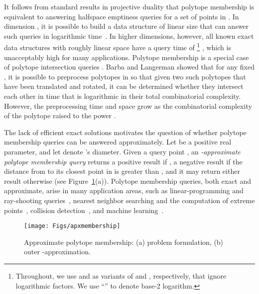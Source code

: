 \documentclass[11pt]{article}   \usepackage[letterpaper,hmargin=2.1cm,vmargin=3cm]{geometry}
\begin{document}
It follows from standard results in projective duality that polytope membership is equivalent to answering halfspace emptiness queries for a set of  points in . In dimension , it is possible to build a data structure of linear size that can answer such queries in logarithmic time~\cite{textbook}. In higher dimensions, however, all known exact data structures with roughly linear space have a query time
of \footnote{Throughout, we use  and  as variants of  and , respectively, that ignore logarithmic factors. We use ``'' to denote base-2 logarithm.}
\cite{Mat92}, which is unacceptably high for many applications. Polytope membership is a special case of polytope intersection queries \cite{ChD87,DoK83,BaL15}. Barba and Langerman \cite{BaL15} showed that for any fixed , it is possible to preprocess polytopes in  so that given two such polytopes that have been translated and rotated, it can be determined whether they intersect each other in time that is logarithmic in their total combinatorial complexity. However, the preprocessing time and space grow as the combinatorial complexity of the polytope raised to the power .

The lack of efficient exact solutions motivates the question of whether polytope membership queries can be answered approximately. Let  be a positive real parameter, and let  denote 's diameter. Given a query point , an \emph{-approximate polytope membership query} returns a positive result if , a negative result if the distance from  to its closest point in  is greater than , and it may return either result otherwise (see Figure~\ref{fig:apxmembership}(a)). Polytope membership queries, both exact and approximate, arise in many application areas, such as linear-programming and ray-shooting queries~\cite{lp-Chan, lp-Chan2, lp-Ramos, lp-Mat, lp-Mat2}, nearest neighbor searching and the computation of extreme points~\cite{hull-Chan,Clarkson-ANN}, collision detection~\cite{collision2}, and machine learning~\cite{SVM}. 

\begin{figure}[htbp]
  \centerline{\texttt{[image: Figs/apxmembership]}}
  \caption{Approximate polytope membership: (a) problem formulation, (b) outer -approximation.}
  \label{fig:apxmembership}
\end{figure}
\end{document}
